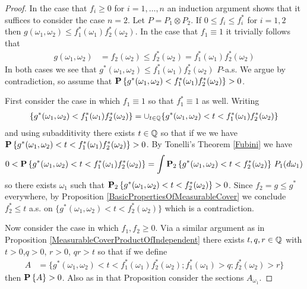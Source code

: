 \begin{proof}
In the case that $f_i \geq 0$ for $i=1, \dotsc, n$  an induction argument shows that it suffices to consider the case $n=2$.  Let $P = P_1 \otimes P_2$.  If $0 \leq f_i \leq f_i^*$ for $i=1, 2$ then $g(\omega_1, \omega_2) \leq f_1^*(\omega_1) f_2^*(\omega_2)$.  In the case that $f_1 \equiv 1$ it trivially follows that 
\begin{align*}
g(\omega_1, \omega_2) &= f_2(\omega_2)  \leq  f_2^*(\omega_2) = f_1^*(\omega_1) f_2^*(\omega_2)
\end{align*}  
In both cases we see that $g^*(\omega_1,\omega_2) \leq f_1^*(\omega_1) f_2^*(\omega_2)$ $P$-a.s.  
We argue by contradiction, so assume that $\probability{g^*(\omega_1,\omega_2) < f_1^*(\omega_1) f_2^*(\omega_2)}>0$.

First consider the case in which $f_1 \equiv 1$ so that $f_1^* \equiv 1$ as well.  Writing
\begin{align*}
\lbrace g^*(\omega_1,\omega_2) < f_1^*(\omega_1) f_2^*(\omega_2)\rbrace =\cup_{t \in \rationals} \lbrace g^*(\omega_1,\omega_2) < t < f_1^*(\omega_1) f_2^*(\omega_2)\rbrace
\end{align*}
and using subadditivity there exists $t \in \rationals$ so that if we we have
$\probability{g^*(\omega_1,\omega_2) < t < f_1^*(\omega_1) f_2^*(\omega_2)} > 0$.  
 By Tonelli's Theorem \ref{Fubini} we
have
\begin{align*}
0 < \probability {g^*(\omega_1,\omega_2) < t < f_1^*(\omega_1) f_2^*(\omega_2)} = \int \sprobability{g^*(\omega_1,\omega_2) < t < f_2^*(\omega_2)}{2} \, P_1(d\omega_1)
\end{align*}
so there exists $\omega_1$ such that $\sprobability{g^*(\omega_1,\omega_2) < t < f_2^*(\omega_2)}{2}>0$.  
Since $f_2 = g \leq g^*$ everywhere, by Proposition \ref{BasicPropertiesOfMeasurableCover}  we conclude $f_2^* \leq t$ a.s. on $\lbrace g^*(\omega_1,\omega_2) < t < f_2^*(\omega_2) \rbrace$ which is a contradiction.

Now consider the case in which $f_1,f_2 \geq 0$.  Via a similar argument as in Proposition \ref{MeasurableCoverProductOfIndependent} there exists $t, q, r \in \rationals$ with $t>0$,$q>0$, $r>0$, $qr>t$ so that if we define 
\begin{align*}
A &= \lbrace g^*(\omega_1,\omega_2) < t < f_1^*(\omega_1) f_2^*(\omega_2); f_1^*(\omega_1) > q ; f_2^*(\omega_2) > r \rbrace
\end{align*}
then $\probability{A}>0$.  Also as in that Proposition consider the sections $A_{\omega_1}$. 


\end{proof}
